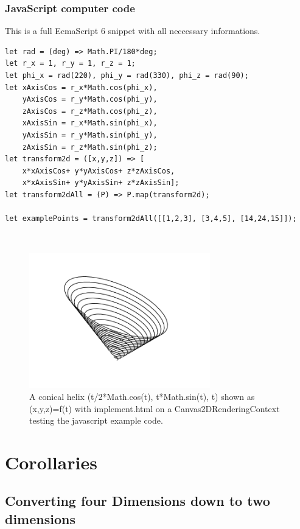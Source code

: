 \documentclass[a4paper]{article}
\begin{document}
\subsubsection{JavaScript computer code}
\begin{example}
This is a full EcmaScript 6 snippet with all neccessary informations.\\
\begin{lstlisting}
let rad = (deg) => Math.PI/180*deg;
let r_x = 1, r_y = 1, r_z = 1; 
let phi_x = rad(220), phi_y = rad(330), phi_z = rad(90); 
let xAxisCos = r_x*Math.cos(phi_x), 
    yAxisCos = r_y*Math.cos(phi_y),
    zAxisCos = r_z*Math.cos(phi_z),
    xAxisSin = r_x*Math.sin(phi_x), 
    yAxisSin = r_y*Math.sin(phi_y),
    zAxisSin = r_z*Math.sin(phi_z);
let transform2d = ([x,y,z]) => [
    x*xAxisCos+ y*yAxisCos+ z*zAxisCos,
    x*xAxisSin+ y*yAxisSin+ z*zAxisSin];
let transform2dAll = (P) => P.map(transform2d);

let examplePoints = transform2dAll([[1,2,3], [3,4,5], [14,24,15]]);
\end{lstlisting}
\end{example}\\



\begin{figure}[ht]
\includegraphics[scale=0.5]{conicalhelix.png}
\caption{A conical helix (t/2*Math.cos(t), t*Math.sin(t), t) shown as (x,y,z)=f(t) with implement.html on a Canvas2DRenderingContext testing the javascript example code.}
\end{figure}




\section{Corollaries}

\subsection{Converting four Dimensions down to two dimensions}\\
\end{document}
